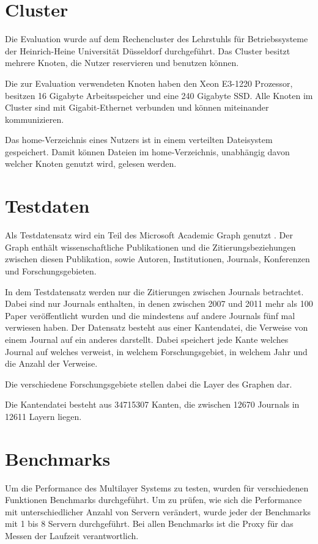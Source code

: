 
\section{Cluster}
\label{cluster}

Die Evaluation wurde auf dem Rechencluster des Lehrstuhls für Betriebssysteme der Heinrich-Heine Universität Düsseldorf durchgeführt.
Das Cluster besitzt mehrere Knoten, die Nutzer reservieren und benutzen können.

Die zur Evaluation verwendeten Knoten haben den Xeon E3-1220 Prozessor, besitzen 16 Gigabyte Arbeitsspeicher und eine 240 Gigabyte SSD.
Alle Knoten im Cluster sind mit Gigabit-Ethernet verbunden und können miteinander kommunizieren. 

Das home-Verzeichnis eines Nutzers ist in einem verteilten Dateisystem gespeichert. Damit können Dateien im home-Verzeichnis, unabhängig davon welcher Knoten genutzt wird, gelesen werden.

\section{Testdaten}


Als Testdatensatz wird ein Teil des Microsoft Academic Graph genutzt \cite{sinha2015an}. Der Graph enthält wissenschaftliche Publikationen und die Zitierungsbeziehungen zwischen diesen Publikation, sowie Autoren, Institutionen, Journals, Konferenzen und Forschungsgebieten.

In dem Testdatensatz werden nur die Zitierungen zwischen Journals betrachtet. Dabei sind nur Journals enthalten, in denen zwischen 2007 und 2011 mehr als 100 Paper veröffentlicht wurden und die mindestens auf andere Journals fünf mal verwiesen haben.
Der Datensatz besteht aus einer Kantendatei, die Verweise von einem Journal auf ein anderes darstellt. Dabei speichert jede Kante welches Journal auf welches verweist, in welchem Forschungsgebiet, in welchem Jahr und die Anzahl der Verweise.

Die verschiedene Forschungsgebiete stellen dabei die Layer des Graphen dar.

Die Kantendatei besteht aus 34715307 Kanten, die zwischen 12670 Journals in 12611 Layern liegen.


\section{Benchmarks}

Um die Performance des Multilayer Systems zu testen, wurden für verschiedenen Funktionen Benchmarks durchgeführt. Um zu prüfen, wie sich die Performance mit unterschiedlicher Anzahl von Servern verändert,
wurde jeder der Benchmarks mit 1 bis 8 Servern durchgeführt. Bei allen Benchmarks ist die Proxy für das Messen der Laufzeit verantwortlich.

